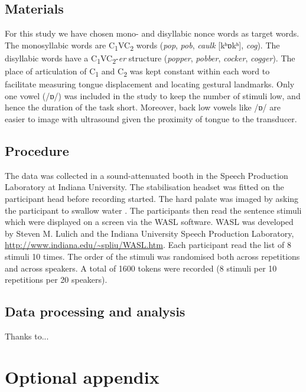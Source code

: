 \documentclass[preprint]{JASAnew}
\begin{document}
\subsection{Materials}\label{materials}

For this study we have chosen mono- and disyllabic nonce words as target
words. The monosyllabic words are C\textsubscript{1}VC\textsubscript{2}
words (\emph{pop}, \emph{pob}, \emph{caulk} {[}kʰɒkʰ{]}, \emph{cog}).
The disyllabic words have a
C\textsubscript{1}VC\textsubscript{2}-\emph{er} structure
(\emph{popper}, \emph{pobber}, \emph{cocker}, \emph{cogger}). The place
of articulation of C\textsubscript{1} and C\textsubscript{2} was kept
constant within each word to facilitate measuring tongue displacement
and locating gestural landmarks. Only one vowel (/ɒ/) was included in
the study to keep the number of stimuli low, and hence the duration of
the task short. Moreover, back low vowels like /ɒ/ are easier to image
with ultrasound given the proximity of tongue to the transducer.

\subsection{Procedure}\label{procedure}

The data was collected in a sound-attenuated booth in the Speech
Production Laboratory at Indiana University. The stabilisation headset
was fitted on the participant head before recording started. The hard
palate was imaged by asking the participant to swallow water
\citep{epstein2005}. The participants then read the sentence stimuli
which were displayed on a screen via the WASL software. WASL was
developed by Steven M. Lulich and the Indiana University Speech
Production Laboratory, \url{http://www.indiana.edu/~spliu/WASL.htm}.
Each participant read the list of 8 stimuli 10 times. The order of the
stimuli was randomised both across repetitions and across speakers. A
total of 1600 tokens were recorded (8 stimuli per 10 repetitions per 20
speakers).

\subsection{Data processing and
analysis}\label{data-processing-and-analysis}

\begin{acknowledgments}
Thanks to...
\end{acknowledgments}

\appendix
\section{Optional appendix}
\end{document}
